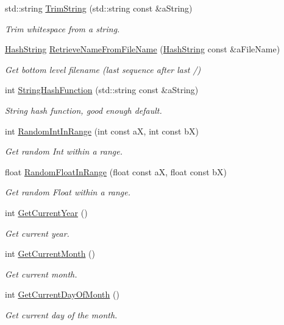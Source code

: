 \begin{DoxyCompactItemize}
std\+::string \hyperlink{namespaceCommon_aead0f844190b0b20cfb5e2dd50d7d622}{Trim\+String} (std\+::string const \&a\+String)
\begin{DoxyCompactList}\small\item\em Trim whitespace from a string. \end{DoxyCompactList}\item 
\hyperlink{classHashString}{Hash\+String} \hyperlink{namespaceCommon_a51874188abdc26c800f2da6840e4a5eb}{Retrieve\+Name\+From\+File\+Name} (\hyperlink{classHashString}{Hash\+String} const \&a\+File\+Name)
\begin{DoxyCompactList}\small\item\em Get bottom level filename (last sequence after last /) \end{DoxyCompactList}\item 
int \hyperlink{namespaceCommon_a994c43a8ea7b03968186a635687a6521}{String\+Hash\+Function} (std\+::string const \&a\+String)
\begin{DoxyCompactList}\small\item\em String hash function, good enough default. \end{DoxyCompactList}\item 
int \hyperlink{namespaceCommon_acbc024bbc4c442c690c150c3c846d22a}{Random\+Int\+In\+Range} (int const aX, int const bX)
\begin{DoxyCompactList}\small\item\em Get random Int within a range. \end{DoxyCompactList}\item 
float \hyperlink{namespaceCommon_a6bb24acf07012e8a715ec182891a852d}{Random\+Float\+In\+Range} (float const aX, float const bX)
\begin{DoxyCompactList}\small\item\em Get random Float within a range. \end{DoxyCompactList}\item 
int \hyperlink{namespaceCommon_a376a1d79a10be75c3acc3cc69c151ec9}{Get\+Current\+Year} ()
\begin{DoxyCompactList}\small\item\em Get current year. \end{DoxyCompactList}\item 
int \hyperlink{namespaceCommon_a9f2091ed3dcff65d0382a1089a9aae87}{Get\+Current\+Month} ()
\begin{DoxyCompactList}\small\item\em Get current month. \end{DoxyCompactList}\item 
int \hyperlink{namespaceCommon_ab8783ce3b9fc2ab21ea67c688d3ad404}{Get\+Current\+Day\+Of\+Month} ()
\begin{DoxyCompactList}\small\item\em Get current day of the month. \end{DoxyCompactList}\end{DoxyCompactItemize}


